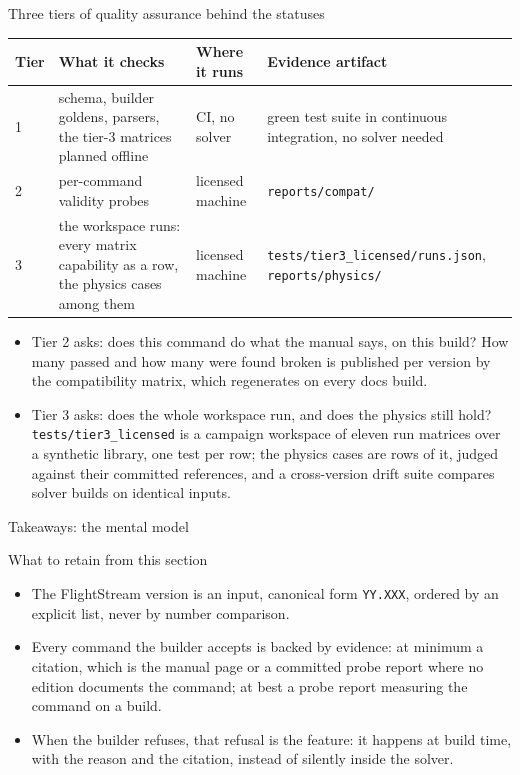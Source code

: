 \documentclass[aspectratio=169,10pt]{beamer}
\newcommand{\code}[1]{\texttt{\small #1}}
\begin{document}
\begin{frame}{Three tiers of quality assurance behind the statuses}
  \small
  \begin{tabular}{@{}lp{3.8cm}p{2.2cm}p{5.3cm}@{}}
    \toprule
    Tier & What it checks & Where it runs & Evidence artifact \\
    \midrule
    1 & schema, builder goldens, parsers, the tier-3 matrices planned offline & CI, no solver & green test suite in continuous integration, no solver needed \\
    2 & per-command validity probes & licensed machine & \code{reports/compat/} \\
    3 & the workspace runs: every matrix capability as a row, the physics cases among them & licensed machine & \code{tests/tier3\_licensed/runs.json}, \code{reports/physics/} \\
    \bottomrule
  \end{tabular}
  \vspace{3mm}
  \begin{itemize}
    \item Tier 2 asks: does this command do what the manual says, on this build? How many passed and how many were found broken is published per version by the compatibility matrix, which regenerates on every docs build.
    \item Tier 3 asks: does the whole workspace run, and does the physics still hold? \code{tests/tier3\_licensed} is a campaign workspace of eleven run matrices over a synthetic library, one test per row; the physics cases are rows of it, judged against their committed references, and a cross-version drift suite compares solver builds on identical inputs.
  \end{itemize}
\end{frame}

\begin{frame}{Takeaways: the mental model}
  \begin{block}{What to retain from this section}
    \begin{itemize}
      \item The FlightStream version is an input, canonical form \code{YY.XXX}, ordered by an explicit list, never by number comparison.
      \item Every command the builder accepts is backed by evidence: at minimum a citation, which is the manual page or a committed probe report where no edition documents the command; at best a probe report measuring the command on a build.
      \item When the builder refuses, that refusal is the feature: it happens at build time, with the reason and the citation, instead of silently inside the solver.
    \end{itemize}
  \end{block}
\end{frame}
\end{document}
